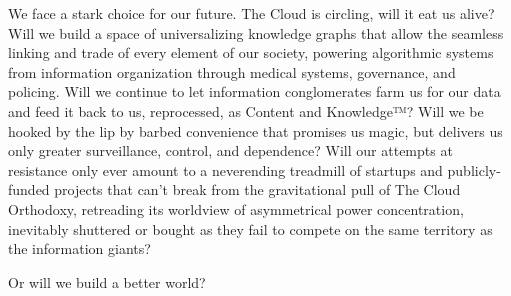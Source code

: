We face a stark choice for our future. The Cloud is circling, will it
eat us alive? Will we build a space of universalizing knowledge graphs
that allow the seamless linking and trade of every element of our
society, powering algorithmic systems from information organization
through medical systems, governance, and policing. Will we continue to
let information conglomerates farm us for our data and feed it back to
us, reprocessed, as Content and Knowledge™? Will we be hooked by the lip
by barbed convenience that promises us magic, but delivers us only
greater surveillance, control, and dependence? Will our attempts at
resistance only ever amount to a neverending treadmill of startups and
publicly-funded projects that can't break from the gravitational pull of
The Cloud Orthodoxy, retreading its worldview of asymmetrical power
concentration, inevitably shuttered or bought as they fail to compete on
the same territory as the information giants?

Or will we build a better world?
